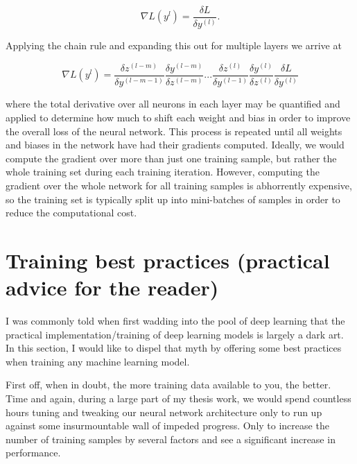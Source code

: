 \begin{equation}
    \nabla L(y^{l}) = \frac{\delta L}{\delta y^{(l)}}.
\end{equation}{}

Applying the chain rule and expanding this out for multiple layers we arrive at

\begin{equation}
    \nabla L(y^{l}) = \frac{\delta z^{(l-m)}}{\delta y^{(l-m-1)}} \frac{\delta y^{(l-m)}}{\delta z^{(l-m)}} ... \frac{\delta z^{(l)}}{\delta y^{(l-1)}} \frac{\delta y^{(l)}}{\delta z^{(l)}} \frac{\delta L}{\delta y^{(l)}} 
\end{equation}{}

where the total derivative over all neurons in each layer may be quantified and applied to determine how much to shift each weight and bias in order to improve the overall loss of the neural network. This process is repeated until all weights and biases in the network have had their gradients computed. Ideally, we would compute the gradient over more than just one training sample, but rather the whole training set during each training iteration. However, computing the gradient over the whole network for all training samples is abhorrently expensive, so the training set is typically split up into mini-batches of samples in order to reduce the computational cost.

%
%
\section{Training best practices (practical advice for the reader)}

I was commonly told when first wadding into the pool of deep learning that the practical implementation/training of deep learning models is largely a dark art. In this section, I would like to dispel that myth by offering some best practices when training any machine learning model.

%
%
First off, when in doubt, the more training data available to you, the better. Time and again, during a large part of my thesis work, we would spend countless hours tuning and tweaking our neural network architecture only to run up against some insurmountable wall of impeded progress. Only to increase the number of training samples by several factors and see a significant increase in performance. 

